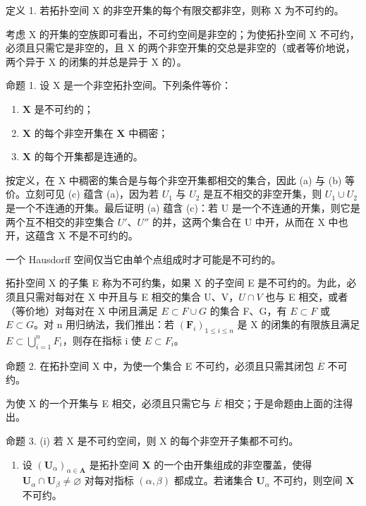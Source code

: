 定义 1. 若拓扑空间 X 的非空开集的每个有限交都非空，则称 X 为不可约的。

考虑 X 的开集的空族即可看出，不可约空间是非空的；为使拓扑空间 X 不可约，必须且只需它是非空的，且 X 的两个非空开集的交总是非空的（或者等价地说，两个异于 X 的闭集的并总是异于 X 的）。

命题 1. 设 X 是一个非空拓扑空间。下列条件等价：

\begin{enumerate}
\def\labelenumi{(\alph{enumi})}
\item
  \(\mathbf{X}\) 是不可约的；
\item
  \(\mathbf{X}\) 的每个非空开集在 \(\mathbf{X}\) 中稠密；
\item
  \(\mathbf{X}\) 的每个开集都是连通的。
\end{enumerate}

按定义，在 X 中稠密的集合是与每个非空开集都相交的集合，因此 (a) 与 (b) 等价。立刻可见 (c) 蕴含 (a)，因为若 \(U_{1}\) 与 \(U_{2}\) 是互不相交的非空开集，则 \(U_{1} \cup U_{2}\) 是一个不连通的开集。最后证明 (a) 蕴含 (c)：若 U 是一个不连通的开集，则它是两个互不相交的非空集合 \(U'\)、\(U''\) 的并，这两个集合在 U 中开，从而在 X 中也开，这蕴含 X 不是不可约的。

一个 Hausdorff 空间仅当它由单个点组成时才可能是不可约的。

拓扑空间 X 的子集 E 称为不可约集，如果 X 的子空间 E 是不可约的。为此，必须且只需对每对在 X 中开且与 E 相交的集合 U、V，\(U \cap V\) 也与 E 相交，或者（等价地）对每对在 X 中闭且满足 \(E \subset F \cup G\) 的集合 F、G，有 \(E \subset F\) 或 \(E \subset G\)。对 n 用归纳法，我们推出：若 \((\mathbf{F}_{i})_{1 \leq i \leq n}\) 是 X 的闭集的有限族且满足 \(E \subset \bigcup_{i=1}^{n} F_{i}\)，则存在指标 i 使 \(E \subset F_{i}\)。

命题 2. 在拓扑空间 X 中，为使一个集合 E 不可约，必须且只需其闭包 \(\overline{E}\) 不可约。

为使 X 的一个开集与 E 相交，必须且只需它与 \(\overline{E}\) 相交；于是命题由上面的注得出。

命题 3. (i) 若 X 是不可约空间，则 X 的每个非空开子集都不可约。

\begin{enumerate}
\def\labelenumi{(\roman{enumi})}
\setcounter{enumi}{1}
\item
  设 \((\mathbf{U}_{\alpha})_{\alpha \in \mathbf{A}}\) 是拓扑空间 \(\mathbf{X}\) 的一个由开集组成的非空覆盖，使得 \(\mathbf{U}_{\alpha} \cap \mathbf{U}_{\beta} \neq \varnothing\) 对每对指标 \((\alpha, \beta)\) 都成立。若诸集合 \(\mathbf{U}_{\alpha}\) 不可约，则空间 \(\mathbf{X}\) 不可约。
\end{enumerate}

